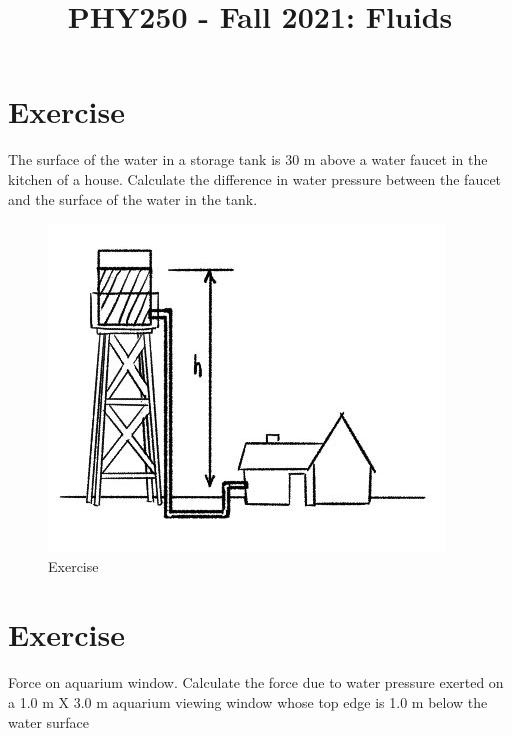 \documentclass[12pt]{article}
\title{PHY250 - Fall 2021: Fluids}
\author{}
\date{}
\begin{document}
\maketitle






\setcounter{example}{1}

\section*{Exercise \theexample}

The surface of the water in a storage tank is 30 m above a water faucet in the kitchen of a house. Calculate the difference
in water pressure between the faucet and the surface of the water in the tank.
\vspace{5mm}

 \begin{figure}[h!]
  \begin{center}
    \includegraphics[height=2.in]{images/example1.jpg}
    \caption{Exercise \theexample }
    \label{1}
  \end{center}
\end{figure}


\section*{Exercise \theexample}

Force on aquarium window. Calculate the force due to water pressure exerted on a 1.0 m X 3.0 m aquarium viewing window whose top
edge is 1.0 m below the water surface

\vspace{5mm}
\end{document}

